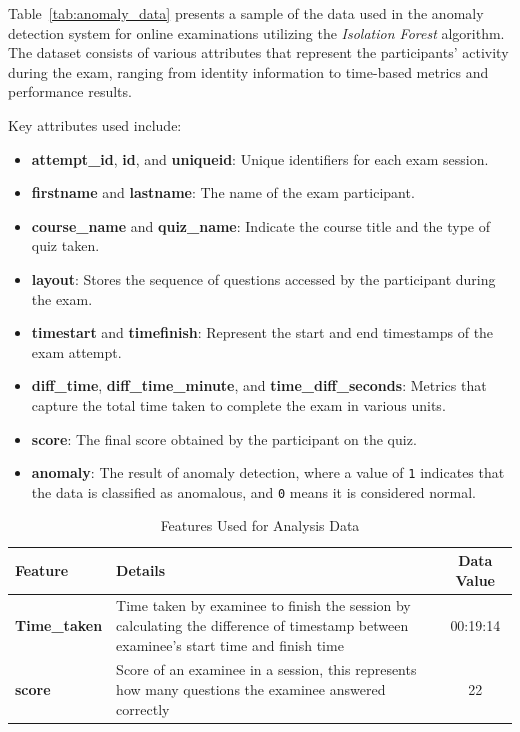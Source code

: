 Table~\ref{tab:anomaly_data} presents a sample of the data used in the anomaly detection system for online examinations utilizing the \textit{Isolation Forest} algorithm. The dataset consists of various attributes that represent the participants' activity during the exam, ranging from identity information to time-based metrics and performance results.

Key attributes used include:

\begin{itemize}
	\item \textbf{attempt\_id}, \textbf{id}, and \textbf{uniqueid}: Unique identifiers for each exam session.
	\item \textbf{firstname} and \textbf{lastname}: The name of the exam participant.
	\item \textbf{course\_name} and \textbf{quiz\_name}: Indicate the course title and the type of quiz taken.
	\item \textbf{layout}: Stores the sequence of questions accessed by the participant during the exam.
	\item \textbf{timestart} and \textbf{timefinish}: Represent the start and end timestamps of the exam attempt.
	\item \textbf{diff\_time}, \textbf{diff\_time\_minute}, and \textbf{time\_diff\_seconds}: Metrics that capture the total time taken to complete the exam in various units.
	\item \textbf{score}: The final score obtained by the participant on the quiz.
	\item \textbf{anomaly}: The result of anomaly detection, where a value of \texttt{1} indicates that the data is classified as anomalous, and \texttt{0} means it is considered normal.
\end{itemize}


\begin{table}[H]
	\centering
	\caption{Features Used for Analysis Data}
	\begin{tabular}{|l|p{10cm}|c|}
		\hline
		\textbf{Feature} & \textbf{Details} & \textbf{Data Value} \\
		\hline
		\textbf{Time\_taken} & Time taken by examinee to finish the session by calculating the difference of timestamp between examinee’s start time and finish time & 00:19:14 \\
		\hline
		\textbf{score} & Score of an examinee in a session, this represents how many questions the examinee answered correctly & 22 \\
		\hline
	\end{tabular}
\end{table}



